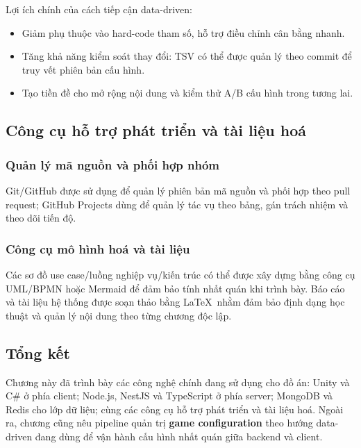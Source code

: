 Lợi ích chính của cách tiếp cận data-driven:
\begin{itemize}
    \item Giảm phụ thuộc vào hard-code tham số, hỗ trợ điều chỉnh cân bằng nhanh.
    \item Tăng khả năng kiểm soát thay đổi: TSV có thể được quản lý theo commit để truy vết phiên bản cấu hình.
    \item Tạo tiền đề cho mở rộng nội dung và kiểm thử A/\allowbreak B cấu hình trong tương lai.
\end{itemize}

\subsection{Công cụ hỗ trợ phát triển và tài liệu hoá}

\subsubsection{Quản lý mã nguồn và phối hợp nhóm}

Git/\allowbreak GitHub được sử dụng để quản lý phiên bản mã nguồn và phối hợp theo pull request; GitHub Projects dùng để quản lý tác vụ theo bảng, gán trách nhiệm và theo dõi tiến độ\cite{github-docs,github-projects}.

\subsubsection{Công cụ mô hình hoá và tài liệu}

Các sơ đồ use case/\allowbreak luồng nghiệp vụ/\allowbreak kiến trúc có thể được xây dựng bằng công cụ UML/\allowbreak BPMN hoặc Mermaid để đảm bảo tính nhất quán khi trình bày\cite{uml-bpmn}. Báo cáo và tài liệu hệ thống được soạn thảo bằng \LaTeX\ nhằm đảm bảo định dạng học thuật và quản lý nội dung theo từng chương độc lập\cite{latex-companion}.

\subsection{Tổng kết}

Chương này đã trình bày các công nghệ chính đang sử dụng cho đồ án: Unity và C\# ở phía client\cite{unity-manual,csharp-lang}; Node.js, NestJS và TypeScript ở phía server\cite{nodejs-docs,nest-docs}; MongoDB và Redis cho lớp dữ liệu\cite{mongodb-guide,redis-in-action}; cùng các công cụ hỗ trợ phát triển và tài liệu hoá\cite{github-docs,github-projects,latex-companion}. Ngoài ra, chương cũng nêu pipeline quản trị \textbf{game configuration} theo hướng data-driven đang dùng để vận hành cấu hình nhất quán giữa backend và client.
